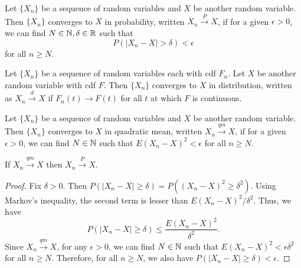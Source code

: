 \documentclass{article}
\begin{document}
\begin{defn}\label{c5d1}
Let $\{X_n\}$ be a sequence of random variables and $X$ be another random
variable. Then $\{X_n\}$ converges to $X$ in probability, written 
$X_n \stackrel{P}\rightarrow X$, if for a given $\epsilon > 0$, we can find
$N \in \mathbb{N}, \delta \in \mathbb{R}$ such that 
\[
P(|X_n - X| > \delta) < \epsilon
\]
for all $n \ge N$.
\end{defn}

\begin{defn}\label{c5d2}
Let $\{X_n\}$ be a sequence of random variables each with cdf $F_n$. Let $X$ be
another random variable with cdf $F$. Then $\{X_n\}$ converges to $X$ in 
distribution, written as $X_n\stackrel
{d}\rightarrow X$ if $F_n(t) \rightarrow F(t)$ for all $t$ at which $F$ is 
continuous.
\end{defn} 

\begin{defn}\label{c5d3}
Let $\{X_n\}$ be a sequence of random variables and $X$ be another random
variable. Then $\{X_n\}$ converges to $X$ in quadratic mean, written 
$X_n \stackrel{qm}\rightarrow X$, if for a given $\epsilon > 0$, we can find
$N \in \mathbb{N}$ such that $E(X_n - X)^2 < \epsilon$ for all $n \ge N$.
\end{defn}

\begin{prop}\label{c5p1}
If $X_n \stackrel{qm}\rightarrow X$ then $X_n \stackrel{P}\rightarrow X$.
\end{prop}
\begin{proof}
Fix $\delta > 0$. Then $P(|X_n - X| \ge \delta) = P((X_n - X)^2 \ge \delta^2)$.
Using Markov's inequality, the second term is lesser than $E(X_n - X)^2/\delta^2$.
Thus, we have
\[
P(|X_n - X| \ge \delta) \le \frac{E(X_n - X)^2}{\delta^2}.
\]
Since $X_n \stackrel{qm}\rightarrow X$, for any $\epsilon > 0$, we can find
$N \in \mathbb{N}$ such that $E(X_n - X)^2 < \epsilon \delta^2$ for all $n \ge N$. 
Therefore, for all $n \ge N$, we also have $P(|X_n - X| \ge \delta) < \epsilon$.
\end{proof}
\end{document}
